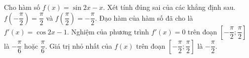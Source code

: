 \begin{ex}
Cho hàm số $f(x)=\sin2x-x$. Xét tính đúng sai của các khẳng định sau.
\choiceTF
{\True $f\left(-\dfrac\pi2\right)=\dfrac\pi2$ và $f\left(\dfrac\pi2\right)=-\dfrac\pi2$.}
{Đạo hàm của hàm số đã cho là $f'(x)=\cos2x-1$.}
{\True Nghiệm của phương trình $f'(x)=0$ trên đoạn $\left[-\dfrac\pi2;\dfrac\pi2\right]$ là $-\dfrac\pi6$ hoặc $\dfrac\pi6$.}
{\True Giá trị nhỏ nhất của $f(x)$ trên đoạn $\left[-\dfrac\pi2;\dfrac\pi2\right]$ là $-\dfrac\pi2$.}
\end{ex}
